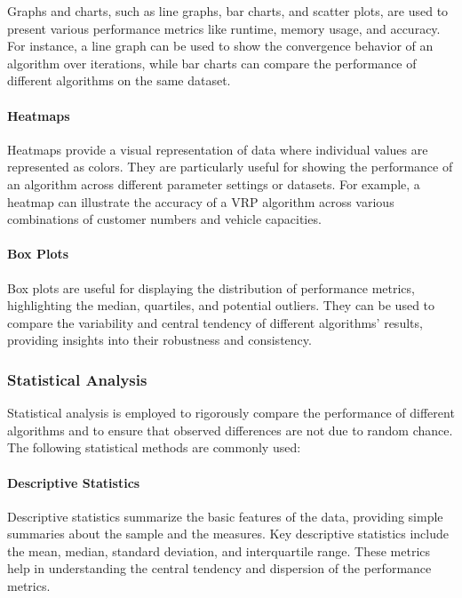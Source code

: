 \documentclass[
]{article}
\begin{document}
Graphs and charts, such as line graphs, bar charts, and scatter plots, are used to present various performance metrics like runtime, memory usage, and accuracy. For instance, a line graph can be used to show the convergence behavior of an algorithm over iterations, while bar charts can compare the performance of different algorithms on the same dataset.

\paragraph{Heatmaps}

Heatmaps provide a visual representation of data where individual values are represented as colors. They are particularly useful for showing the performance of an algorithm across different parameter settings or datasets. For example, a heatmap can illustrate the accuracy of a VRP algorithm across various combinations of customer numbers and vehicle capacities.

\paragraph{Box Plots}

Box plots are useful for displaying the distribution of performance metrics, highlighting the median, quartiles, and potential outliers. They can be used to compare the variability and central tendency of different algorithms' results, providing insights into their robustness and consistency.

\subsubsection{Statistical Analysis}

Statistical analysis is employed to rigorously compare the performance of different algorithms and to ensure that observed differences are not due to random chance. The following statistical methods are commonly used:

\paragraph{Descriptive Statistics}

Descriptive statistics summarize the basic features of the data, providing simple summaries about the sample and the measures. Key descriptive statistics include the mean, median, standard deviation, and interquartile range. These metrics help in understanding the central tendency and dispersion of the performance metrics.
\end{document}
